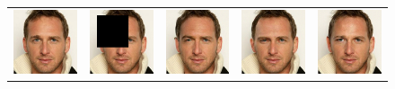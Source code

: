 \begin{figure}
\begin{center}
\begin{tabular}{ccccc}
      \includegraphics[width=.15\textwidth]{Chapter2/samples/inpainting/table/2/x.png} &   
      \includegraphics[width=.15\textwidth]{Chapter2/samples/inpainting/table/2/y.png} &
      \includegraphics[width=.15\textwidth]{Chapter2/samples/inpainting/table/2/sr3.png} &
      \includegraphics[width=.15\textwidth]{Chapter2/samples/inpainting/table/2/Song.png} & 
      \includegraphics[width=.15\textwidth]{Chapter2/samples/inpainting/table/2/DV.png} \\


\end{tabular}
\end{center}
\end{figure}
